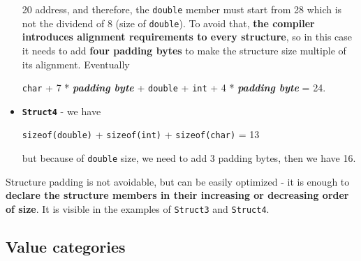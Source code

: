 \documentclass[../main]{subfiles}
\begin{document}
\begin{itemize}
    20 address, and therefore, the \texttt{double} member must start from 28 which is not the dividend of 8 (size of \texttt{double}). To avoid that,
    \textbf{the compiler introduces alignment requirements to every structure}, so in this case it needs to add \textbf{four padding bytes} to make
    the structure size multiple of its alignment. Eventually
    \begin{center}
        \texttt{char} + 7 * \textbf{\textit{padding byte}}  + \texttt{double} + \texttt{int} + 4 * \textbf{\textit{padding byte}}  = 24.
    \end{center}
    \item \textbf{\texttt{Struct4}} - we have
    \begin{center}
        \texttt{sizeof(double)} + \texttt{sizeof(int)} + \texttt{sizeof(char)} = 13
    \end{center}
    but because of \texttt{double} size, we need to add 3 padding bytes, then we have 16.
\end{itemize}

    Structure padding is not avoidable, but can be easily optimized - it is enough to \textbf{declare the structure members in their increasing or decreasing order of size}.
It is visible in the examples of \texttt{Struct3} and \texttt{Struct4}.

\subsection{Value categories}
\end{document}
